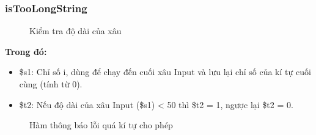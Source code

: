 \documentclass[a4paper,12pt]{article}
\begin{document}
\subsubsection{isTooLongString}
\begin{figure}[!h]
	\centerline{}
	\label{fig:bai6}
\end{figure}
\begin{figure}[!h]
	\centerline{}
	\caption{Kiểm tra độ dài của xâu}
	\label{fig:bai6}
\end{figure}
\noindent
\textbf{Trong đó: }
\begin{itemize}
    \item \$s1: Chỉ số i, dùng để chạy đến cuối xâu Input và lưu lại chỉ số của kí tự cuối cùng (tính từ 0).
    \item \$t2: Nếu độ dài của xâu Input (\$s1) < 50 thì \$t2 = 1, ngược lại \$t2 = 0.
\end{itemize}
\begin{figure}[!h]
	\centerline{}
	\caption{Hàm thông báo lỗi quá kí tự cho phép}
	\label{fig:bai6}
\end{figure}
\end{document}
